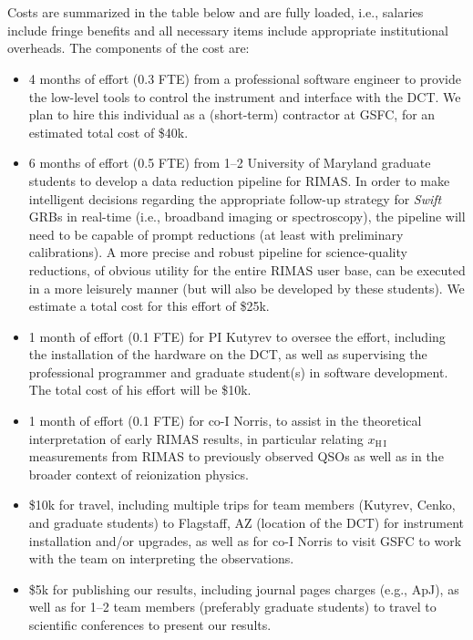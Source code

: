 \documentclass[letterpaper,11pt]{article}
\newcommand{\apj}{ApJ}%
\begin{document}
\smallskip\\
{\footnotesize


}

\clearpage

\smallskip\\
Costs are summarized in the table below and are fully loaded, i.e., salaries include
fringe benefits and all necessary items include appropriate institutional overheads.
The components of the cost are:
\begin{itemize}
\item 4 months of effort (0.3 FTE) from a professional software engineer to provide
the low-level tools to control the instrument and interface with the DCT.  We plan
to hire this individual as a (short-term) contractor at GSFC, for an estimated total
cost of \$40k.
\item 6 months of effort (0.5 FTE) from 1--2 University of Maryland graduate students
to develop a data reduction pipeline for RIMAS.  In order to make intelligent
decisions regarding the appropriate follow-up strategy for \textit{Swift} GRBs in
real-time (i.e., broadband imaging or spectroscopy), the pipeline will need to be
capable of prompt reductions (at least with preliminary calibrations).  A more 
precise and robust pipeline for science-quality reductions, of obvious utility 
for the entire RIMAS user base, can be executed in a more leisurely manner (but will
also be developed by these students).  We estimate a total cost for this effort 
of \$25k.
\item 1 month of effort (0.1 FTE) for PI Kutyrev to oversee the effort,
including the installation of the hardware on the DCT, as well as supervising the
professional programmer and graduate student(s) in software development.  The 
total cost of his effort will be \$10k.
\item 1 month of effort (0.1 FTE) for co-I Norris, to assist in the theoretical
interpretation of early RIMAS results, in particular relating $x_{\mathrm{H\,I}}$
measurements from RIMAS to previously observed QSOs as well as in the broader 
context of reionization physics.
\item \$10k for travel, including multiple trips for team members (Kutyrev, Cenko,
and graduate students) to Flagstaff, AZ (location of the DCT) for instrument 
installation and/or upgrades, as well as for co-I Norris to visit GSFC to work 
with the team on interpreting the observations.
\item \$5k for publishing our results, including journal pages charges (e.g., \apj),
as well as for 1--2 team members (preferably graduate students) to travel to 
scientific conferences to present our results.
\end{itemize}
\end{document}
